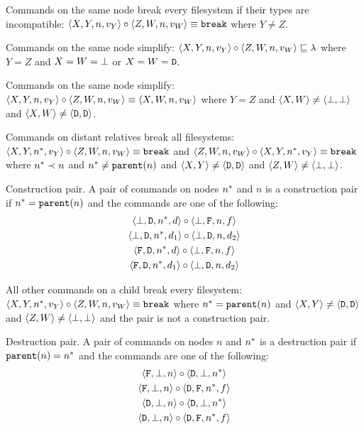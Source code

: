\begin{myax}\label{ax_same_breaks}
Commands on the same node break every filesystem if their types are incompatible:
$\langle{X,Y,n,v_Y}\rangle\circ\langle{Z,W,n,v_W}\rangle \equiv \mathtt{break}$ where $Y\ne Z$.
\end{myax}

\begin{myax}\label{ax_same_emptyseq}
Commands on the same node simplify:
$\langle{X,Y,n,v_Y}\rangle\circ\langle{Z,W,n,v_W}\rangle \sqsubseteq \lambda$ where $Y=Z$ and $X=W=\bot$ 
or $X=W=\mathtt{D}$.
\end{myax}

\begin{myax}\label{ax_same_singlec}
Commands on the same node simplify:
$\langle{X,Y,n,v_Y}\rangle\circ \langle{Z,W,n,v_W}\rangle \equiv \langle{X,W,n,v_W}\rangle$ where $Y=Z$ and $\langle{X,W}\rangle\neq\langle{\bot,\bot}\rangle$ and $\langle{X,W}\rangle\neq\langle{\mathtt{D},\mathtt{D}}\rangle$.
\end{myax}

\begin{myax}\label{ax_distantrel_breaks}
Commands on distant relatives break all filesystems:
$\langle{X,Y,n^*,v_Y}\rangle\circ\langle{Z,W,n,v_W}\rangle \equiv \mathtt{break}$
and $\langle{Z,W,n,v_W}\rangle\circ\langle{X,Y,n^*,v_Y}\rangle \equiv\mathtt{break}$
where $n^*\prec n$ and $n^*\neq\mathtt{parent}(n)$ and $\langle{X,Y}\rangle\neq\langle{\mathtt{D},\mathtt{D}}\rangle$ and $\langle{Z,W}\rangle\neq\langle{\bot,\bot}\rangle$.
\end{myax}

\begin{mydef}{Construction pair.}
A pair of commands on nodes $n^*$ and $n$ is a construction pair if $n^*=\mathtt{parent}(n)$ 
and the commands are one
of the following:
   \begin{gather*}
            \cbdaa{\nn}{\vald}\cc  \cbfaa{n}{\valf} \\
            \cbdaa{\nn}{\valdi}\cc  \cbdaa{n}{\valdii} \\ %
            \cfdaa{\nn}{\vald}\cc  \cbfaa{n}{\valf} \\
            \cfdaa{\nn}{\valdi}\cc  \cbdaa{n}{\valdii} %
   \end{gather*}
\end{mydef}

\begin{myax}\label{ax_directchild_breaks}
All other commands on a child break every filesystem:
$\langle{X,Y,n^*,v_Y}\rangle\circ\langle{Z,W,n,v_W}\rangle \equiv \mathtt{break}$ where $n^*=\mathtt{parent}(n)$ and $\langle{X,Y}\rangle\neq\langle{\mathtt{D},\mathtt{D}}\rangle$ and $\langle{Z,W}\rangle\neq\langle{\bot,\bot}\rangle$
and the pair is not a construction pair.
\end{myax}

\begin{mydef}{Destruction pair.}
A pair of commands on nodes $n$ and $n^*$ is a destruction pair if $\mathtt{parent}(n)=n^*$ and the commands are one
of the following:
   \begin{gather*}
            \langle{\mathtt{F},\bot,n}\rangle\circ  \langle{\mathtt{D},\bot,n^*}\rangle \\
            \langle{\mathtt{F},\bot,n}\rangle\circ  \langle{\mathtt{D},\mathtt{F},n^*,f}\rangle \\
            \langle{\mathtt{D},\bot,n}\rangle\circ  \langle{\mathtt{D},\bot,n^*}\rangle \\
            \langle{\mathtt{D},\bot,n}\rangle\circ  \langle{\mathtt{D},\mathtt{F},n^*,f}\rangle
   \end{gather*}
\end{mydef}

